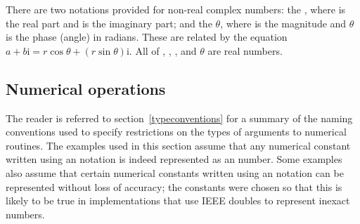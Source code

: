 There are two notations provided for non-real complex numbers:
the 
,
where  is the real part and  is the imaginary part;
and the 
$\theta$,
where  is the magnitude and $\theta$ is the phase (angle) in radians.
These are related by the equation
$a+b\mathrm{i} = r \cos\theta + (r \sin\theta) \mathrm{i}$.
All of , , , and $\theta$ are real numbers.


\subsection{Numerical operations}

The reader is referred to section~\ref{typeconventions} for a summary
of the naming conventions used to specify restrictions on the types of
arguments to numerical routines.
The examples used in this section assume that any numerical constant written
using an  notation is indeed represented as an 
number.  Some examples also assume that certain numerical constants written
using an  notation can be represented without loss of
accuracy; the  constants were chosen so that this is
likely to be true in implementations that use IEEE doubles to represent
inexact numbers.


